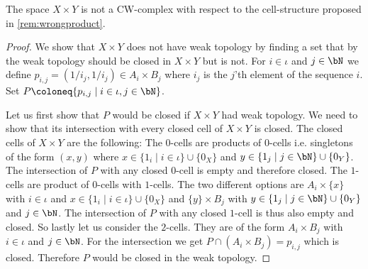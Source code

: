 \begin{lem} \label{lem:proofofcounter}
    The space $X \times Y$ is not a CW-complex with respect to the cell-structure proposed in \ref{rem:wrongproduct}.
\end{lem}
\begin{proof}
    We show that $X \times Y$ does not have weak topology by finding a set that by the weak topology should be closed in $X \times Y$ but is not. 
    For $i \in \iota$ and $j \in \bN$ we define $p_{i,j} = (1/i_j, 1 /i_j) \in A_i \times B_j$ where $i_j$ is the $j$'th element of the sequence $i$.
    Set $P \coloneq \{ p_{i, j} \mid i \in \iota, j \in \bN\}$.
    
    Let us first show that $P$ would be closed if $X \times Y$ had weak topology. We need to show that its intersection with every closed cell of $X \times Y$ is closed.
    The closed cells of $X \times Y$ are the following: 
    The $0$-cells are products of $0$-cells i.e. singletons of the form $(x, y)$ where $x \in \{1_i \mid i \in \iota\} \cup \{0_X\}$ and $y \in \{1_j \mid j \in \bN\} \cup \{0_Y\}$. The intersection of $P$ with any closed $0$-cell is empty and therefore closed. 
    The $1$-cells are product of $0$-cells with $1$-cells. The two different options are $A_i \times \{x\}$ with $i \in \iota$ and $x \in \{1_i \mid i \in \iota\} \cup \{0_X\}$ and $\{y\} \times B_j$ with $y \in \{1_j \mid j \in \bN\} \cup \{0_Y\}$ and $j \in \bN$. The intersection of $P$ with any closed $1$-cell is thus also empty and closed. 
    So lastly let us consider the $2$-cells. They are of the form $A_i \times B_j$ with $i \in \iota$ and $j \in \bN$. For the intersection we get $P \cap (A_i \times B_j) = p_{i, j}$ which is closed. 
    Therefore $P$ would be closed in the weak topology. 


\end{proof}
